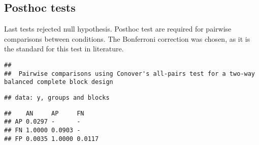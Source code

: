 \documentclass[
]{article}
\newenvironment{Shaded}{\begin{snugshade}}{\end{snugshade}}
\newcommand{\AttributeTok}[1]{\textcolor[rgb]{0.77,0.63,0.00}{#1}}
\newcommand{\FunctionTok}[1]{\textcolor[rgb]{0.00,0.00,0.00}{#1}}
\newcommand{\NormalTok}[1]{#1}
\newcommand{\OtherTok}[1]{\textcolor[rgb]{0.56,0.35,0.01}{#1}}
\newcommand{\SpecialCharTok}[1]{\textcolor[rgb]{0.00,0.00,0.00}{#1}}
\newcommand{\StringTok}[1]{\textcolor[rgb]{0.31,0.60,0.02}{#1}}
\begin{document}
\hypertarget{posthoc-tests}{%
\subsection{Posthoc tests}\label{posthoc-tests}}

Last tests rejected null hypothesis. Posthoc test are required for
pairwise comparisons between conditions. The Bonferroni correction was
chosen, as it is the standard for this test in literature.

\begin{Shaded}
\end{Shaded}

\begin{verbatim}
## 
##  Pairwise comparisons using Conover's all-pairs test for a two-way balanced complete block design
\end{verbatim}

\begin{verbatim}
## data: y, groups and blocks
\end{verbatim}

\begin{verbatim}
##    AN     AP     FN    
## AP 0.0297 -      -     
## FN 1.0000 0.0903 -     
## FP 0.0035 1.0000 0.0117
\end{verbatim}
\end{document}
